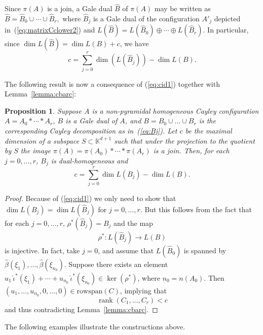 \documentclass[11pt]{amsart}
\newcounter{examples}
\theoremstyle{plain}
\newtheorem{proposition}[theorem]{Proposition}
\theoremstyle{definition}
\theoremstyle{remark}
\newcommand{\rank}{\operatorname{rank}}
\newcommand{\bp}{\begin{proof}}
\newcommand{\beq}{\begin{equation}}
\newcommand{\eeq}{\end{equation}}
\renewcommand{\k}{{\mathbb K}}
\numberwithin{equation}{section}
\begin{document}
Since $\pi(A)$ is a join, a Gale dual $\hat B$ of $\pi(A)$ may be written as 
$\hat B = \hat B_0 \cup \cdots \cup \hat B_r,$
where $\hat B_j$ is a Gale dual of the configuration $A'_j$ depicted in~(\ref{eq:matrixCclower2}) and
$L(\hat B) = L(\hat B_0) \oplus \cdots \oplus L(\hat B_r)$.
In particular, since $\dim L(\hat B) = \dim L(B) + c$, we have
\beq\label{eq:cid1}
c = \sum_{j=0}^r \dim(L(\hat B_j)) - \dim L(B).
\eeq


The following result is now a consequence of  (\ref{eq:cid1}) together with Lemma~\ref{lemma:cbarc}:

\begin{proposition}\label{lem:ABC}  
Suppose $A$ is a non-pyramidal homogeneous Cayley configuration $A = A_0 \ast \cdots \ast A_r$,  $B$ is a Gale dual of $A$,  and $B= B_0 \cup \dots \cup B_r$ is the corresponding Cayley decomposition  as in~(\ref{eq:Bj}). Let $c$ be the maximal
dimension of a subspace $S \subset \k^{d+1}$ such that under the projection to the quotient by $S$ the image $\pi(A) = \pi(A_0)\ast \cdots \ast \pi(A_r)$ is a join.
Then, for each $j=0,\dots,r$, $B_j$ is dual-homogeneous and 
\begin{equation}\label{eq:cdual}
 c = \sum_{j=0}^r \dim L(B_j)  - \dim L(B).
\end{equation}
\end{proposition}

\bp
Because of (\ref{eq:cid1}) we only need to show that $\dim L(B_j) = \dim L(\hat B_j)$ for $j = 0,\dots,r$.  But this follows from the fact that for each $j =0,\dots,r$, $\rho^*(\hat B_j) = B_j$ and the map
$$\rho^* \colon L(\hat B_j) \to L(B)$$
is injective. In fact, take $j=0$, and assume that 
$L(\hat B_0)$ is spanned by $\hat \beta(\xi_1), \dots, \hat \beta(\xi_{n_0})$.  Suppose there exists an element 
$u_1 \,\hat \iota^*(\xi_1) + \cdots + u_{n_0}\,\hat \iota^*(\xi_{n_0}) \in \ker(\rho^*)$, where $n_0 = n(A_0)$.
Then $(u_1,\dots,u_{n_0},0,\dots,0) \in {\mathrm{rowspan}}(C)$, 
implying that $$\rank(C_1,\dots,C_r)<c$$ and thus contradicting Lemma~\ref{lemma:cbarc}.
\end{proof}



The following examples illustrate the constructions above.
\end{document}
